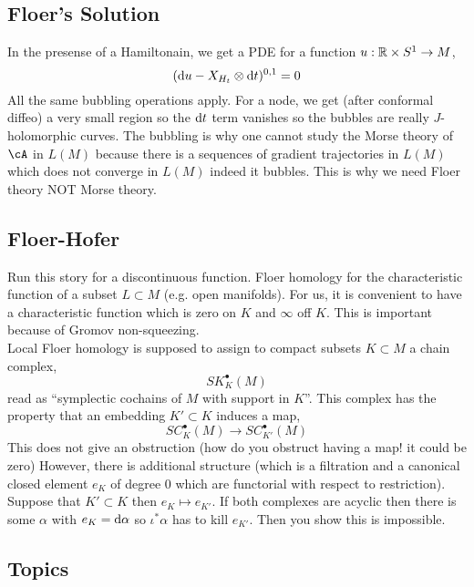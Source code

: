 \documentclass[12pt]{article}
\begin{document}
\subsection{Floer's Solution}

In the presense of a Hamiltonain, we get a PDE for a function $u : \mathbb{R} \times S^1 \to M$,
\[ (\mathrm{d}{u} - X_{H_t} \otimes \mathrm{d}{t})^{0,1} = 0 \]
All the same bubbling operations apply. For a node, we get (after conformal diffeo) a very small region so the $\mathrm{d}{t}$ term vanishes so the bubbles are really $J$-holomorphic curves. The bubbling is why one cannot study the Morse theory of $\cA$ in $L(M)$ because there is a sequences of gradient trajectories in $L(M)$ which does not converge in $L(M)$ indeed it bubbles. This is why we need Floer theory NOT Morse theory. 

\subsection{Floer-Hofer}

Run this story for a discontinuous function. Floer homology for the characteristic function of a subset $L \subset M$ (e.g. open manifolds). For us, it is convenient to have a characteristic function which is zero on $K$ and $\infty$ off $K$. This is important because of Gromov non-squeezing. 
\bigskip\\
Local Floer homology is supposed to assign to compact subsets $K \subset M$ a chain complex,
\[ SK_K^\bullet(M) \]
read as ``symplectic cochains of $M$ with support in $K$''. This complex has the property that an embedding $K' \subset K$ induces a map,
\[ SC^\bullet_K(M) \to SC^\bullet_{K'}(M) \]
This does not give an obstruction (how do you obstruct having a map! it could be zero) However, there is additional structure (which is a filtration and a canonical closed element $e_K$ of degree $0$ which are functorial with respect to restriction). Suppose that $K' \subset K$ then $e_{K} \mapsto e_{K'}$. If both complexes are acyclic then there is some $\alpha$ with $e_{K} = \mathrm{d}{\alpha}$ so $\iota^* \alpha$ has to kill $e_{K'}$. Then you show this is impossible. 

\subsection{Topics}
\end{document}
